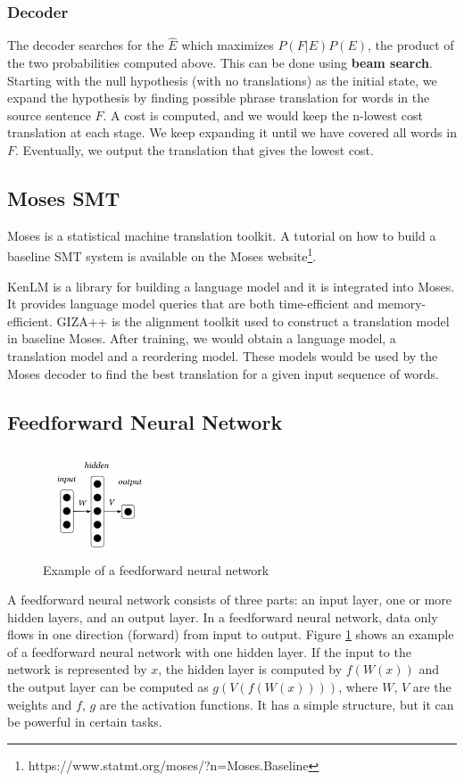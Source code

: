 \documentclass[12pt,a4paper,twoside,openright]{report}
\begin{document}
\subsubsection{Decoder}
The decoder searches for the $\hat{E}$ which maximizes $P(F|E)P(E)$, the product of the two probabilities computed above. This can be done using \textbf{beam search}. Starting with the null hypothesis (with no translations) as the initial state, we expand the hypothesis by finding possible phrase translation for words in the source sentence $F$. A cost is computed, and we would keep the n-lowest cost translation at each stage. We keep expanding it until we have covered all words in $F$. Eventually, we output the translation that gives the lowest cost.

\subsection{Moses SMT}
Moses\cite{moses} is a statistical machine translation toolkit. A tutorial on how to build a baseline SMT system is available on the Moses website\footnote{https://www.statmt.org/moses/?n=Moses.Baseline}. 

KenLM\cite{heafield-2011-kenlm} is a library for building a language model and it is integrated into Moses. It provides language model queries that are both time-efficient and memory-efficient. GIZA++\cite{giza_pp} is the alignment toolkit used to construct a translation model in baseline Moses. After training, we would obtain a language model, a translation model and a reordering model. These models would be used by the Moses decoder to find the best translation for a given input sequence of words.

\subsection{Feedforward Neural Network}
\begin{figure}[ht]
\centering
\includegraphics[width=0.3\textwidth]{images/fnn.png}
\caption{Example of a feedforward neural network}
\label{fig:fnn}
\end{figure}
A feedforward neural network consists of three parts: an input layer, one or more hidden layers, and an output layer. In a feedforward neural network, data only flows in one direction (forward) from input to output. Figure \ref{fig:fnn} shows an example of a feedforward neural network with one hidden layer. If the input to the network is represented by $x$, the hidden layer is computed by $f(W(x))$ and the output layer can be computed as $g(V(f(W(x))))$, where $W$, $V$ are the weights and $f$, $g$ are the activation functions. It has a simple structure, but it can be powerful in certain tasks.
\end{document}
